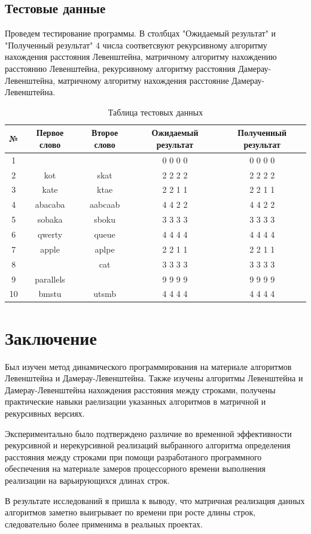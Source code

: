 \documentclass[12pt]{report}
\begin{document}
\section{Тестовые данные}

\par
Проведем тестирование программы. В столбцах "Ожидаемый результат" и "Полученный результат" 4 числа соответсвуют рекурсивному алгоритму нахождения расстояния Левенштейна, матричному алгоритму нахождению расстоянию Левенштейна, рекурсивному алгоритму расстояния Дамерау-Левенштейна, матричному алгоритму нахождения расстояние Дамерау-Левенштейна.

\begin{table} [h!]
\caption{Таблица тестовых данных}
	\begin{tabular}{|c c c c c|} 
 	\hline
	№ & Первое слово & Второе слово & Ожидаемый результат & Полученный результат \\ [0.8ex] 
 	\hline\hline
 	1 &  &  & 0 0 0 0 & 0 0 0 0\\
 	\hline
 	2 & kot & skat & 2 2 2 2 & 2 2 2 2\\
 	\hline
	3 & kate & ktae & 2 2 1 1 & 2 2 1 1\\
	\hline
	4 & abacaba & aabcaab & 4 4 2 2 & 4 4 2 2\\
	\hline
	5 & sobaka & sboku & 3 3 3 3 & 3 3 3 3\\
	\hline
	6 & qwerty & queue & 4 4 4 4 & 4 4 4 4\\
	\hline
	7 & apple & aplpe & 2 2 1 1  & 2 2 1 1\\
	\hline
	8 &  & cat & 3 3 3 3 & 3 3 3 3\\
	\hline
	9 & parallels &  & 9 9 9 9 & 9 9 9 9\\
	\hline
	10 & bmstu & utsmb & 4 4 4 4 & 4 4 4 4\\
	\hline
	\end{tabular}
\end{table}



\chapter*{Заключение}
Был изучен метод динамического программирования на материале алгоритмов Левенштейна и Дамерау-Левенштейна.
Также изучены алгоритмы Левенштейна и Дамерау-Левенштейна нахождения расстояния между строками, получены практические навыки раелизации указанных алгоритмов
в матричной  и рекурсивных версиях. 

Экспериментально было подтверждено различие во временной эффективности рекурсивной и нерекурсивной реализаций выбранного алгоритма определения расстояния между строками при помощи разработаного программного обеспечения на материале замеров процессорного времени выполнения реализации на варьирующихся длинах строк. 

В результате исследований я пришла к выводу, что матричная реализация данных алгоритмов заметно выигрывает по времени при росте длины строк, следовательно более применима в реальных проектах.
\end{document}
